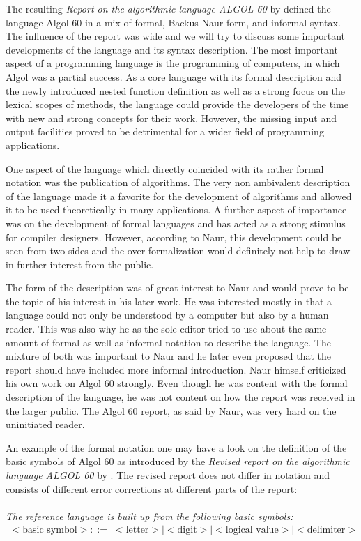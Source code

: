 \documentclass{article}
\begin{document}
The resulting \textit{Report on the algorithmic language ALGOL 60} by \citet{backus1960report} defined the language Algol 60 in a mix of formal, Backus Naur form, and informal syntax. The influence of the report was wide and we will try to discuss some important developments of the language and its syntax description. The most important aspect of a programming language is the programming of computers, in which Algol was a partial success. As a core language with its formal description and the newly introduced nested function definition as well as a strong focus on the lexical scopes of methods, the language could provide the developers of the time with new and strong concepts for their work. However, the missing input and output facilities proved to be detrimental for a wider field of programming applications.

One aspect of the language which directly coincided with its rather formal notation was the publication of algorithms. The very non ambivalent description of the language made it a favorite for the development of algorithms and allowed it to be used theoretically in many applications. A further aspect of importance was on the development of formal languages and has acted as a strong stimulus for compiler designers. However, according to Naur, this development could be seen from two sides and the over formalization would definitely not help to draw in further interest from the public.

The form of the description was of great interest to Naur and would prove to be the topic of his interest in his later work. He was interested mostly in that a language could not only be understood by a computer but also by a human reader. This was also why he as the sole editor tried to use about the same amount of formal as well as informal notation to describe the language. The mixture of both was important to Naur and he later even proposed that the report should have included more informal introduction. Naur himself criticized his own work on Algol 60 strongly. Even though he was content with the formal description of the language, he was not content on how the report was received in the larger public. The Algol 60 report, as said by Naur, was very hard on the uninitiated reader.

An example of the formal notation one may have a look on the definition of the basic symbols of Algol 60 as introduced by the \textit{Revised report on the algorithmic language ALGOL 60} by \cite{Backus1963RevisedRO}. The revised report does not differ in notation and consists of different error corrections at different parts of the report:
\\ \\
\textit{The reference language is built up from the following basic symbols:}
\begin{equation} \label{eq5}
\begin{split}
<\text{basic symbol}> ::=&<\text{letter}>|<\text{digit}>|<\text{logical value}>|<\text{delimiter}> \\
\end{split}
\end{equation}
\end{document}
